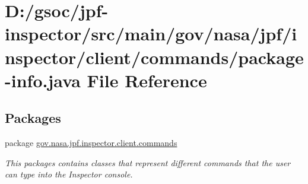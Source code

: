 \hypertarget{client_2commands_2package-info_8java}{}\section{D\+:/gsoc/jpf-\/inspector/src/main/gov/nasa/jpf/inspector/client/commands/package-\/info.java File Reference}
\label{client_2commands_2package-info_8java}
\subsection*{Packages}
\begin{DoxyCompactItemize}
\item 
package \hyperlink{namespacegov_1_1nasa_1_1jpf_1_1inspector_1_1client_1_1commands}{gov.\+nasa.\+jpf.\+inspector.\+client.\+commands}
\begin{DoxyCompactList}\small\item\em This packages contains classes that represent different commands that the user can type into the Inspector console. \end{DoxyCompactList}\end{DoxyCompactItemize}
